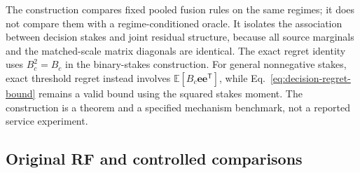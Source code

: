 \documentclass[10pt]{article}
\begin{document}
The construction compares fixed pooled fusion rules on the same regimes;
it does not compare them with a regime-conditioned oracle. It isolates the
association between decision stakes and joint residual structure, because
all source marginals and the matched-scale matrix diagonals are identical.
The exact regret identity uses $B_c^2=B_c$ in the binary-stakes construction.
For general nonnegative stakes, exact threshold regret instead involves
$\mathbb E[B_c\boldsymbol e\boldsymbol e^{\mathsf T}]$, while
Eq.~\eqref{eq:decision-regret-bound} remains a valid bound using the squared
stakes moment. The construction is a theorem and a specified mechanism
benchmark, not a reported service experiment.
\subsection{Original RF and controlled comparisons}
\label{sec:baselines}
\end{document}

